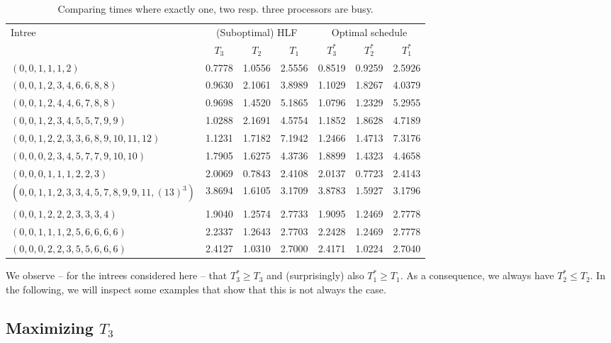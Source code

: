 \begin{table}[th]
  \centering
  \begin{tabular}[ht]{l|ccc|ccc}
    \multirow{2}{*}{Intree} & \multicolumn{3}{c|}{(Suboptimal) HLF} & \multicolumn{3}{c}{Optimal schedule} \\
    & $T_3$ & $T_2$ & $T_1$ & $T_3^*$ & $T_2^*$ & $T_1^*$ \\
    \hline
    $(0,0,1,1,1,2)$ & 0.7778 & 1.0556 & 2.5556 & 0.8519 & 0.9259 & 2.5926 \\
    $(0,0,1,2,3,4,6,6,8,8)$ & 0.9630 & 2.1061 & 3.8989 & 1.1029 & 1.8267 & 4.0379 \\
    $(0,0,1,2,4,4,6,7,8,8)$ & 0.9698 & 1.4520 & 5.1865 & 1.0796 & 1.2329 & 5.2955 \\
    $(0,0,1,2,3,4,5,5,7,9,9)$ & 1.0288 & 2.1691 & 4.5754 & 1.1852 & 1.8628 & 4.7189 \\
    $(0,0,1,2,2,3,3,6,8,9,10,11,12)$ & 1.1231 & 1.7182 & 7.1942 & 1.2466 & 1.4713 & 7.3176 \\
    $(0,0,0,2,3,4,5,7,7,9,10,10)$ & 1.7905 & 1.6275 & 4.3736 & 1.8899 & 1.4323 & 4.4658 \\
    $(0,0,0,1,1,1,2,2,3)$ & 2.0069 & 0.7843 & 2.4108 & 2.0137 & 0.7723 & 2.4143 \\ 
    $(0,0,1,1,2,3,3,4,5,7,8,9,9,11,(13)^3)$ 
      & 3.8694 & 1.6105 & 3.1709 & 3.8783 & 1.5927 & 3.1796 \\
    $(0, 0, 1, 2, 2, 2, 3, 3, 3, 4)$ & 1.9040 & 1.2574 & 2.7733 & 1.9095 & 1.2469 & 2.7778 \\
    $(0, 0, 1, 1, 1, 2, 5, 6, 6, 6, 6)$ & 2.2337 & 1.2643 & 2.7703 & 2.2428 & 1.2469 & 2.7778 \\
    $(0,0,0,2,2,3,5,5,6,6,6)$ & 2.4127 & 1.0310 & 2.7000 & 2.4171 & 1.0224 & 2.7040
  \end{tabular}
  \caption{Comparing times where exactly one, two resp. three processors are busy.}
  \label{tab:comparing-t1-t2-t3-selected-intrees}
\end{table}

We observe -- for the intrees considered here -- that $T_3^* \geq T_3$ and (surprisingly) also $T_1^* \geq T_1$. As a consequence, we always have $T_2^* \leq T_2$. In the following, we will inspect some examples that show that this is not always the case.

\subsection{Maximizing $T_3$}
\label{sec:p3-disproving-long-p3}

